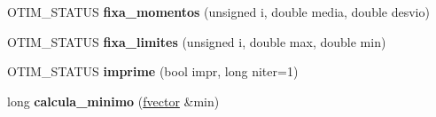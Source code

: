 \begin{DoxyCompactItemize}
\item 
O\+T\+I\+M\+\_\+\+S\+T\+A\+T\+US {\bfseries fixa\+\_\+momentos} (unsigned i, double media, double desvio)\hypertarget{classotim_a4df63c1081da375a75135517952c19a2}{}\label{classotim_a4df63c1081da375a75135517952c19a2}

\item 
O\+T\+I\+M\+\_\+\+S\+T\+A\+T\+US {\bfseries fixa\+\_\+limites} (unsigned i, double max, double min)\hypertarget{classotim_a69feed2b3fd2715d7d29cd252205e886}{}\label{classotim_a69feed2b3fd2715d7d29cd252205e886}

\item 
O\+T\+I\+M\+\_\+\+S\+T\+A\+T\+US {\bfseries imprime} (bool impr, long niter=1)\hypertarget{classotim_ab020a9ca38fe64b3de0952d2f1a0d3fd}{}\label{classotim_ab020a9ca38fe64b3de0952d2f1a0d3fd}

\item 
long {\bfseries calcula\+\_\+minimo} (\hyperlink{classfvector}{fvector} \&min)\hypertarget{classotim_ac893228562bc3e3121bb2b8ef065b702}{}\label{classotim_ac893228562bc3e3121bb2b8ef065b702}

\end{DoxyCompactItemize}
